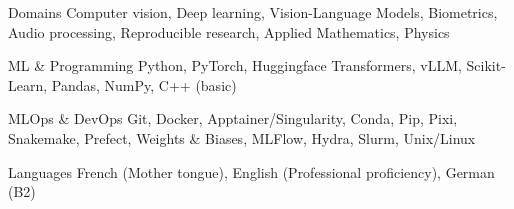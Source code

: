 

\begin{cvskills}

  \cvskill
    {Domains} %
    {Computer vision, Deep learning, Vision-Language Models, Biometrics, Audio processing, Reproducible research, Applied Mathematics, Physics} %

  \cvskill
    {ML \& Programming} %
    {Python, PyTorch, Huggingface Transformers, vLLM, Scikit-Learn, Pandas, NumPy, C++ (basic)} %

  \cvskill
    {MLOps \& DevOps} %
    {Git, Docker, Apptainer/Singularity, Conda, Pip, Pixi, Snakemake, Prefect, Weights \& Biases, MLFlow, Hydra, Slurm, Unix/Linux} %

  \cvskill
    {Languages} %
    {French (Mother tongue), English (Professional proficiency), German (B2)} %

\end{cvskills}
